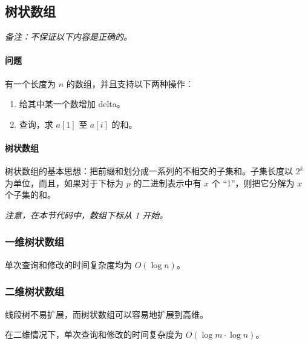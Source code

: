 
\subsection{树状数组}
	\emph{备注：不保证以下内容是正确的。}
	
	\paragraph{问题} 有一个长度为 $n$ 的数组，并且支持以下两种操作：
	
	\begin{enumerate}
		\item 给其中某一个数增加 delta。
		\item 查询，求 $a[1]$ 至 $a[i]$ 的和。
	\end{enumerate}
	
	\paragraph{树状数组} 树状数组的基本思想：把前缀和划分成一系列的不相交的子集和。子集长度以 $2^k$ 为单位，而且，如果对于下标为 $p$ 的二进制表示中有 $x$ 个 “1”，则把它分解为 $x$ 个子集的和。
	
	\emph{注意，在本节代码中，数组下标从 1 开始。}
	
	\subsubsection{一维树状数组}
		单次查询和修改的时间复杂度均为 $O(\log n)$。
		
		
	
	\subsubsection{二维树状数组}
		线段树不易扩展，而树状数组可以容易地扩展到高维。
		
		在二维情况下，单次查询和修改的时间复杂度为 $O(\log m\cdot \log n)$。
		
		
